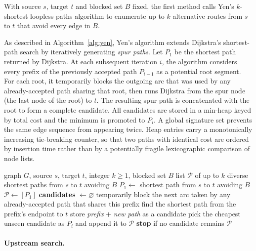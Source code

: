 With source $s$, target $t$ and blocked set $B$ fixed, the first method
calls Yen's $k$-shortest loopless paths algorithm \cite{yen_algorithm} to
enumerate up to $k$ alternative routes from $s$ to $t$ that avoid every
edge in $B$.

As described in Algorithm~\ref{alg:yen},
Yen's algorithm extends Dijkstra's shortest-path search by iteratively
generating \emph{spur paths}. Let $P_1$ be the shortest path returned by
Dijkstra. At each subsequent iteration $i$, the algorithm considers every
prefix of the previously accepted path $P_{i-1}$ as a potential root
segment. For each root, it temporarily blocks the outgoing arc that was
used by any already-accepted path sharing that root, then runs Dijkstra
from the spur node (the last node of the root) to $t$. The resulting
spur path is concatenated with the root to form a complete candidate.
All candidates are stored in a min-heap keyed by total cost and the
minimum is promoted to $P_i$. A global signature set prevents the same
edge sequence from appearing twice. Heap entries carry a monotonically
increasing tie-breaking counter, so that two paths with identical cost
are ordered by insertion time rather than by a potentially fragile
lexicographic comparison of node lists.

\begin{algorithm}[H]
\caption{High-level pseudocode for \textsc{YenKShortestPaths}, which enumerates
up to $k$ loopless detour paths while avoiding blocked edges.}\label{alg:yen}
\begin{algorithmic}[1]
\Require graph $G$, source $s$, target $t$, integer $k \geq 1$, blocked set $B$
\Ensure list $\mathcal{P}$ of up to $k$ diverse shortest paths from $s$ to $t$ avoiding $B$
\State $P_1 \leftarrow$ shortest path from $s$ to $t$ avoiding $B$
\State $\mathcal{P} \leftarrow [P_1]$
  \State \textbf{candidates} $\leftarrow \varnothing$
    \State temporarily block the next arc taken by any already-accepted path that shares this prefix
    \State find the shortest path from the prefix's endpoint to $t$
    \State store \textit{prefix} $+$ \textit{new path} as a candidate
  \EndFor
  \State pick the cheapest unseen candidate as $P_i$ and append it to $\mathcal{P}$
  \State \textbf{stop} if no candidate remains
\EndFor
\State \Return $\mathcal{P}$
\end{algorithmic}
\end{algorithm}

\paragraph{Upstream search.}
\label{par:upstream}

